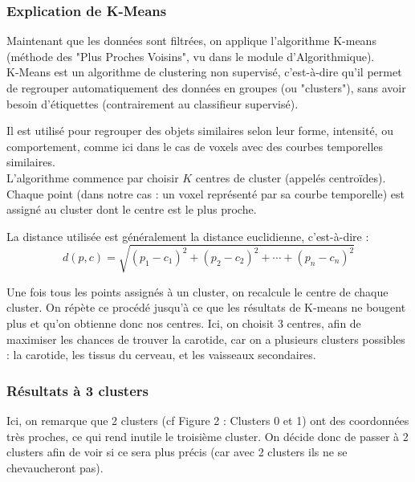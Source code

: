 \documentclass{article}
\begin{document}
                
           
            \subsubsection*{Explication de K-Means}
                Maintenant que les données sont filtrées, on applique l'algorithme K-means (méthode des "Plus Proches Voisins", vu dans le module d'Algorithmique).\\
    
                K-Means est un algorithme de clustering non supervisé, c'est-à-dire qu'il permet de regrouper automatiquement des données en groupes (ou "clusters"), sans avoir besoin d'étiquettes (contrairement au classifieur supervisé).
                
                Il est utilisé pour regrouper des objets similaires selon leur forme, intensité, ou comportement, comme ici dans le cas de voxels avec des courbes temporelles similaires.\\
                
                L'algorithme commence par choisir $K$ centres de cluster (appelés centroïdes). Chaque point (dans notre cas : un voxel représenté par sa courbe temporelle) est assigné au cluster dont le centre est le plus proche.
                
                \noindent La distance utilisée est généralement la distance euclidienne, c'est-à-dire :
                \[ d(p, c) = \sqrt{(p_1 - c_1)^2 + (p_2 - c_2)^2 + \cdots + (p_n - c_n)^2} \]
                
                Une fois tous les points assignés à un cluster, on recalcule le centre de chaque cluster. On répète ce procédé jusqu'à ce que les résultats de K-means ne bougent plus et qu’on obtienne donc nos centres. Ici, on choisit 3 centres, afin de maximiser les chances de trouver la carotide, car on a plusieurs clusters possibles : la carotide, les tissus du cerveau, et les vaisseaux secondaires.
            
            \subsubsection*{Résultats à 3 clusters}
                Ici, on remarque que 2 clusters (cf Figure 2 : Clusters 0 et 1) ont des coordonnées très proches, ce qui rend inutile le troisième cluster. 
                On décide donc de passer à 2 clusters afin de voir si ce sera plus précis (car avec 2 clusters ils ne se chevaucheront pas).
           
\end{document}
